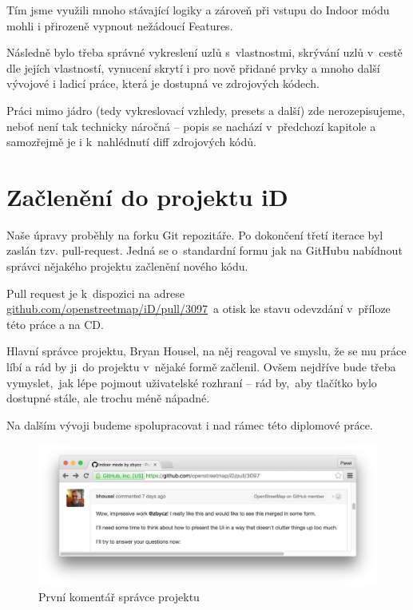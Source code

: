 Tím jsme využili mnoho stávající logiky a zároveň při vstupu do Indoor módu mohli i přirozeně vypnout nežádoucí Features.

Následně bylo třeba správné vykreslení uzlů s~vlastnostmi, skrývání uzlů v~cestě dle jejích vlastností, vynucení skrytí i pro nově přidané prvky a mnoho další vývojové i ladicí práce, která je dostupná ve zdrojových kódech.

Práci mimo jádro (tedy vykreslovací vzhledy, presets a další) zde nerozepisujeme, neboť není tak technicky náročná -- popis se nachází v~předchozí kapitole a samozřejmě je i k~nahlédnutí diff zdrojových kódů.

\section{Začlenění do projektu iD}\label{zaux10dlenux11bnuxed-do-projektu-id}

Naše úpravy proběhly na forku Git repozitáře. Po dokončení třetí iterace byl zaslán tzv. pull-request. Jedná se o~standardní formu jak na GitHubu nabídnout správci nějakého projektu začlenění nového kódu.

Pull request je k~dispozici na adrese \\ \href{https://github.com/openstreetmap/iD/pull/3097}{github.com/openstreetmap/iD/pull/3097}~a otisk ke stavu odevzdání v~příloze této práce a na CD.

Hlavní správce projektu, Bryan Housel, na něj reagoval ve smyslu, že se mu práce líbí a rád by ji~do projektu v~nějaké formě začlenil. Ovšem nejdříve bude třeba vymyslet,~jak lépe pojmout uživatelské rozhraní -- rád by,~aby tlačítko bylo dostupné stále, ale trochu méně nápadné.

Na dalším vývoji budeme spolupracovat i nad rámec této diplomové práce.

 \begin{figure}
	  \centering
      \includegraphics[width=\textwidth]{img/35-pull-req-comment.png}
      \caption{První komentář správce projektu\cite{zdroj56}}
      \label{obr35}
  \end{figure}



